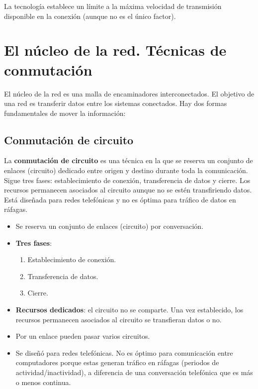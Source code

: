 La tecnología establece un límite a la máxima velocidad de transmisión disponible en la conexión (aunque no es el único factor).


\section{El núcleo de la red. Técnicas de conmutación}

El núcleo de la red es una malla de encaminadores interconectados. El objetivo de una red es transferir datos entre los sistemas conectados. Hay dos formas fundamentales de mover la información:

\subsection{Conmutación de circuito}

\begin{definicion}
La \textbf{conmutación de circuito} es una técnica en la que se reserva un conjunto de enlaces (circuito) dedicado entre origen y destino durante toda la comunicación. Sigue tres fases: establecimiento de conexión, transferencia de datos y cierre. Los recursos permanecen asociados al circuito aunque no se estén transfiriendo datos. Está diseñada para redes telefónicas y no es óptima para tráfico de datos en ráfagas.
\end{definicion}

\begin{itemize}
    \item Se reserva un conjunto de enlaces (circuito) por conversación.
    \item \textbf{Tres fases}:
    \begin{enumerate}
        \item Establecimiento de conexión.
        \item Transferencia de datos.
        \item Cierre.
    \end{enumerate}
    \item \textbf{Recursos dedicados}: el circuito no se comparte. Una vez establecido, los recursos permanecen asociados al circuito se transfieran datos o no.
    \item Por un enlace pueden pasar varios circuitos.
    \item Se diseñó para redes telefónicas. No es óptimo para comunicación entre computadores porque estas generan tráfico en ráfagas (periodos de actividad/inactividad), a diferencia de una conversación telefónica que es más o menos continua.
\end{itemize}

